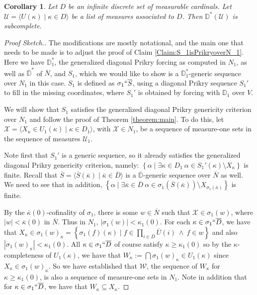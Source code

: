 \documentclass{amsart}
\newtheorem{corollary}[theorem]{Corollary}
\theoremstyle{definition}
\theoremstyle{remark}
\newcommand{\D}{\mathbb{D}}
\newcommand{\N}{{\overline{N}}}
\renewcommand{\S}{{\overline{S}}}
\newcommand{\U}{\mathcal{U}}
\newcommand{\st}{\; | \;}
\newcommand{\set}[2]{\left\{#1\st #2 \right\}}
\newcommand{\seq}[2]{\langle #1 \st #2 \rangle}
\begin{document}
\begin{corollary} 
Let $D$ be an infinite discrete set of measurable cardinals. Let $\U = \seq{ U(\kappa) }{ \kappa \in D }$ be a list of measures associated to $D$. Then $\D^*(\U)$ is subcomplete.
\end{corollary}
\begin{proof}[Proof Sketch.]
The modifications are mostly notational, and the main one that needs to be made is to adjust the proof of Claim \ref{Claim:S_1isPrikryoverN_1}. Here we have $\D^*_1$, the generalized diagonal Prikry forcing as computed in $N_1$, as well as $\overline{\D}^*$ of $\N$, 
and $S_1$, which we would like to show is a $\D_1^*$-generic sequence over $N_1$ in this case. $S_1$ is defined as $\sigma_1 ``\overline S$, using a diagonal Prikry sequence $S_1'$ to fill in the missing coordinates, where $S_1'$ is obtained by forcing with $\D_1$ over $V$.

We will show that $S_1$ satisfies the generalized diagonal Prikry genericity criterion over $N_1$ and follow the proof of Theorem \ref{theorem:main}. To do this, let $\mathcal X = \seq{ X_\kappa \in U_1(\kappa) }{ \kappa \in D_1 }$, with $\mathcal X \in N_1$, be a sequence of measure-one sets in the sequence of measures $\U_1$.

Note first that $S_1'$ is a generic sequence, so it already satisfies the generalized diagonal Prikry genericity criterion, namely:
$\set{ \alpha }{ \exists \kappa \in D_1 \ \alpha \in S_1'(\kappa) \setminus X_\kappa }$ is finite.
Recall that $\S = \seq{ \S(\overline \kappa) }{ \overline \kappa \in \overline D }$ is a $\overline{\D}$-generic sequence over $\N$ as well.
We need to see that in addition, $\set{ \alpha }{ \exists \overline \kappa \in \overline D \ \alpha \in \sigma_1(\S(\overline \kappa)) \setminus X_{\sigma_1(\overline \kappa)} }$ is finite.

By the $\overline{\kappa}(0)$-cofinality of $\sigma_1$, there is some $w \in \N$ such that $\mathcal X \in \sigma_1(w)$, where $|w| < \overline{\kappa}(0)$ in $\N$. Thus in $N_1$, $|\sigma_1(w)| < \kappa_1(0)$. 
For each $\kappa \in \sigma_1``\overline D$, we have that $X_\kappa \in \sigma_1(w)_\kappa = \set{\sigma_1(f)( \kappa) }{ f \in \prod_{i \in \overline D} \overline U(i) \ \land \ f \in w }$ and also $|\sigma_1(w)_\kappa|<\kappa_1(0).$ All $\kappa \in \sigma_1``\overline D$ of course satisfy $\kappa \geq \kappa_1(0)$ so by the $\kappa$-completeness of $U_1(\kappa)$, we have that $W_\kappa := \bigcap \sigma_1(w)_\kappa \in U_1(\kappa)$ since $X_\kappa \in \sigma_1(w)_\kappa$.
So we have established that $\mathcal W$, the sequence of $W_\kappa$ for $\kappa \geq \kappa_1(0)$, is also a sequence of measure-one sets in $N_1$. Note in addition that for $\kappa \in \sigma_1``\overline D$, we have that $W_\kappa \subseteq X_\kappa$. 


\end{proof}
\end{document}
